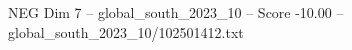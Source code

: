 \begin{textsample}{NEG Dim 7 – global\_south\_2023\_10 – Score -10.00 – global\_south\_2023\_10/102501412.txt}
\end{textsample}
